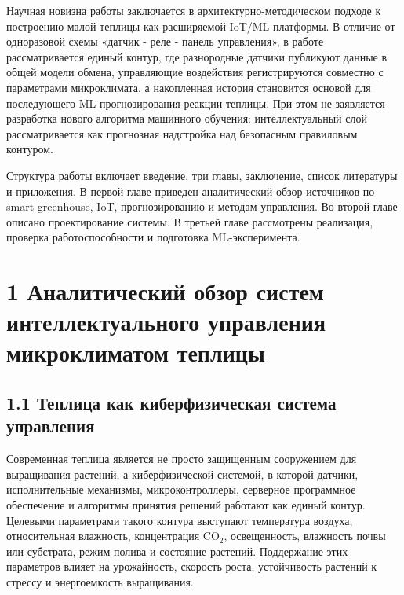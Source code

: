 \documentclass[a4paper,14pt]{extarticle}
\begin{document}
Научная новизна работы заключается в архитектурно-методическом подходе к
построению малой теплицы как расширяемой IoT/ML-платформы. В отличие от
одноразовой схемы «датчик - реле - панель управления», в работе
рассматривается единый контур, где разнородные датчики публикуют данные
в общей модели обмена, управляющие воздействия регистрируются совместно
с параметрами микроклимата, а накопленная история становится основой для
последующего ML-прогнозирования реакции теплицы. При этом не заявляется
разработка нового алгоритма машинного обучения: интеллектуальный слой
рассматривается как прогнозная надстройка над безопасным правиловым
контуром.

Структура работы включает введение, три главы, заключение, список
литературы и приложения. В первой главе приведен аналитический обзор
источников по smart greenhouse, IoT, прогнозированию и методам
управления. Во второй главе описано проектирование системы. В третьей
главе рассмотрены реализация, проверка работоспособности и подготовка
ML-эксперимента.

\section{1 Аналитический обзор систем интеллектуального управления
микроклиматом
теплицы}\label{ux430ux43dux430ux43bux438ux442ux438ux447ux435ux441ux43aux438ux439-ux43eux431ux437ux43eux440-ux441ux438ux441ux442ux435ux43c-ux438ux43dux442ux435ux43bux43bux435ux43aux442ux443ux430ux43bux44cux43dux43eux433ux43e-ux443ux43fux440ux430ux432ux43bux435ux43dux438ux44f-ux43cux438ux43aux440ux43eux43aux43bux438ux43cux430ux442ux43eux43c-ux442ux435ux43fux43bux438ux446ux44b}

\subsection{1.1 Теплица как киберфизическая система
управления}\label{ux442ux435ux43fux43bux438ux446ux430-ux43aux430ux43a-ux43aux438ux431ux435ux440ux444ux438ux437ux438ux447ux435ux441ux43aux430ux44f-ux441ux438ux441ux442ux435ux43cux430-ux443ux43fux440ux430ux432ux43bux435ux43dux438ux44f}

Современная теплица является не просто защищенным сооружением для
выращивания растений, а киберфизической системой, в которой датчики,
исполнительные механизмы, микроконтроллеры, серверное программное
обеспечение и алгоритмы принятия решений работают как единый контур.
Целевыми параметрами такого контура выступают температура воздуха,
относительная влажность, концентрация CO\(_2\), освещенность, влажность
почвы или субстрата, режим полива и состояние растений. Поддержание этих
параметров влияет на урожайность, скорость роста, устойчивость растений
к стрессу и энергоемкость выращивания.
\end{document}
